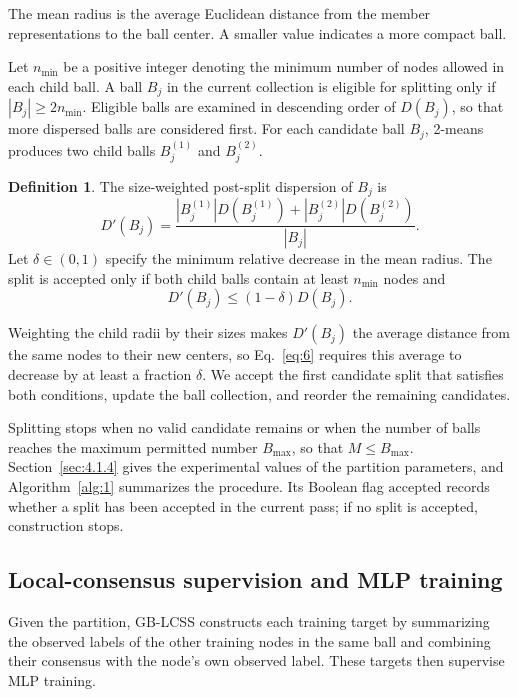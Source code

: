 \documentclass[times,review,10pt]{elsarticle}
\theoremstyle{definition}
\newtheorem{definition}{Definition}
\theoremstyle{plain}
\begin{document}
The mean radius is the average Euclidean distance from the member representations to the ball center. A smaller value indicates a more compact ball.


Let \(n_{\min}\) be a positive integer denoting the minimum number of nodes allowed in each child ball. A ball \(B_j\) in the current collection is eligible for splitting only if \(|B_j|\geq 2n_{\min}\). Eligible balls are examined in descending order of \(D(B_j)\), so that more dispersed balls are considered first. For each candidate ball \(B_j\), 2-means produces two child balls \(B_j^{(1)}\) and \(B_j^{(2)}\).

\begin{definition}
The size-weighted post-split dispersion of \(B_j\) is
\begin{equation}\label{eq:5}
D'(B_j) = \frac{|B_j^{(1)}|D(B_j^{(1)}) + |B_j^{(2)}|D(B_j^{(2)})}{|B_j|}.
\end{equation}
Let \(\delta \in (0,1)\) specify the minimum relative decrease in the mean radius. The split is accepted only if both child balls contain at least \(n_{\min}\) nodes and
\begin{equation}\label{eq:6}
D'(B_j) \leq (1 - \delta)D(B_j).
\end{equation}
\end{definition}

Weighting the child radii by their sizes makes \(D'(B_j)\) the average distance from the same nodes to their new centers, so Eq.~\eqref{eq:6} requires this average to decrease by at least a fraction \(\delta\). We accept the first candidate split that satisfies both conditions, update the ball collection, and reorder the remaining candidates.

Splitting stops when no valid candidate remains or when the number of balls reaches the maximum permitted number \(B_{\max}\), so that \(M\leq B_{\max}\). Section~\ref{sec:4.1.4} gives the experimental values of the partition parameters, and Algorithm~\ref{alg:1} summarizes the procedure. Its Boolean flag \(\mathrm{accepted}\) records whether a split has been accepted in the current pass; if no split is accepted, construction stops.



\subsection{Local-consensus supervision and MLP training}\label{sec:3.3}

Given the partition, GB-LCSS constructs each training target by summarizing the observed labels of the other training nodes in the same ball and combining their consensus with the node's own observed label. These targets then supervise MLP training.
\end{document}
